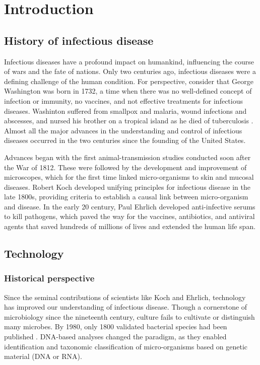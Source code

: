 
\chapter{Introduction}

\section{History of infectious disease}

Infectious diseases have a profound impact on humankind, influencing the course of wars and the fate of nations. Only two centuries ago, infectious diseases were a defining challenge of the human condition. For perspective, consider that George Washington was born in 1732, a time when there was no well-defined concept of infection or immunity, no vaccines, and not effective treatments for infectious diseases. Washinton suffered from smallpox and malaria, wound infections and abscesses, and nursed his brother on a tropical island as he died of tuberculosis \cite{Fauci:2012us}. Almost all the major advances in the understanding and control of infectious diseases occurred in the two centuries since the founding of the United States. 

Advances began with the first animal-transmission studies conducted soon after the War of 1812. These were followed by the development and improvement of microscopes, which for the first time linked micro-organisms to skin and mucosal diseases. Robert Koch developed unifying principles for infectious disease in the late 1800s, providing criteria to establish a causal link between micro-organism and disease. In the early 20 century, Paul Ehrlich developed anti-infective serums to kill pathogens, which paved the way for the vaccines, antibiotics, and antiviral agents that saved hundreds of millions of lives and extended the human life span.

\section{Technology}

\subsection{Historical perspective}

Since the seminal contributions of scientists like Koch and Ehrlich, technology has improved our understanding of infectious disease. Though a cornerstone of microbiology since the nineteenth century, culture fails to cultivate or distinguish many microbes. By 1980, only 1800 validated bacterial species had been published \cite{Fournier:2013ewa}. DNA-based analyses changed the paradigm, as they enabled identification and taxonomic classification of micro-organisms based on genetic material (DNA or RNA). 

